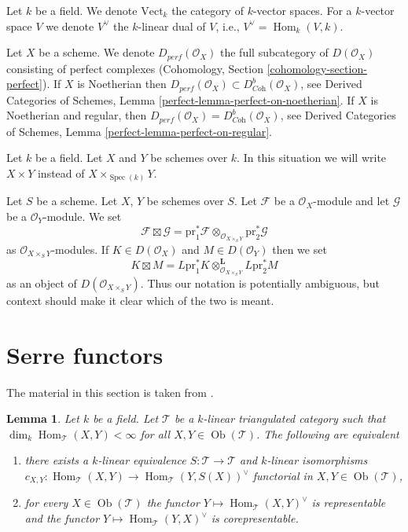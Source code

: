 \documentclass{stacks-project}
\theoremstyle{plain}
\newtheorem{lemma}[subsection]{Lemma}
\theoremstyle{definition}
\theoremstyle{remark}
\numberwithin{equation}{subsection}
\def\Spec{\mathop{\mathrm{Spec}}}
\def\Hom{\mathop{\mathrm{Hom}}\nolimits}
\def\Ob{\mathop{\mathrm{Ob}}\nolimits}
\begin{document}
\medskip\noindent
Let $k$ be a field. We denote $\text{Vect}_k$ the category of
$k$-vector spaces. For a $k$-vector space $V$ we denote
$V^\vee$ the $k$-linear dual of $V$, i.e., $V^\vee = \Hom_k(V, k)$.

\medskip\noindent
Let $X$ be a scheme. We denote $D_{perf}(\mathcal{O}_X)$ the full
subcategory of $D(\mathcal{O}_X)$ consisting of perfect complexes
(Cohomology, Section \ref{cohomology-section-perfect}).
If $X$ is Noetherian then
$D_{perf}(\mathcal{O}_X) \subset D^b_{\textit{Coh}}(\mathcal{O}_X)$, see
Derived Categories of Schemes, Lemma \ref{perfect-lemma-perfect-on-noetherian}.
If $X$ is Noetherian and regular, then
$D_{perf}(\mathcal{O}_X) = D^b_{\textit{Coh}}(\mathcal{O}_X)$, see
Derived Categories of Schemes, Lemma \ref{perfect-lemma-perfect-on-regular}.

\medskip\noindent
Let $k$ be a field. Let $X$ and $Y$ be schemes over $k$. In this
situation we will write $X \times Y$ instead of $X \times_{\Spec(k)} Y$.


\medskip\noindent
Let $S$ be a scheme. Let $X$, $Y$ be schemes over $S$.
Let $\mathcal{F}$ be a $\mathcal{O}_X$-module and let
$\mathcal{G}$ be a $\mathcal{O}_Y$-module. We set
$$
\mathcal{F} \boxtimes \mathcal{G} =
\text{pr}_1^*\mathcal{F} \otimes_{\mathcal{O}_{X \times_S Y}}
\text{pr}_2^*\mathcal{G}
$$
as $\mathcal{O}_{X \times_S Y}$-modules.
If $K \in D(\mathcal{O}_X)$ and $M \in D(\mathcal{O}_Y)$ then we set
$$
K \boxtimes M =
L\text{pr}_1^*K \otimes_{\mathcal{O}_{X \times_S Y}}^\mathbf{L} L\text{pr}_2^*M
$$
as an object of $D(\mathcal{O}_{X \times_S Y})$.
Thus our notation is potentially ambiguous, but context should make it clear
which of the two is meant.





\section{Serre functors}
\label{section-Serre-functors}

\noindent
The material in this section is taken from \cite{Bondal-Kapranov}.

\begin{lemma}
\label{lemma-Serre-functor-exists}
Let $k$ be a field. Let $\mathcal{T}$ be a $k$-linear
triangulated category such that $\dim_k \Hom_\mathcal{T}(X, Y) < \infty$
for all $X, Y \in \Ob(\mathcal{T})$. The following are equivalent
\begin{enumerate}
\item there exists a $k$-linear equivalence
$S : \mathcal{T} \to \mathcal{T}$ and $k$-linear isomorphisms
$c_{X, Y} : \Hom_\mathcal{T}(X, Y) \to \Hom_\mathcal{T}(Y, S(X))^\vee$
functorial in $X, Y \in \Ob(\mathcal{T})$,
\item for every $X \in \Ob(\mathcal{T})$
the functor $Y \mapsto \Hom_\mathcal{T}(X, Y)^\vee$
is representable and the functor $Y \mapsto \Hom_\mathcal{T}(Y, X)^\vee$
is corepresentable.
\end{enumerate}
\end{lemma}
\end{document}
